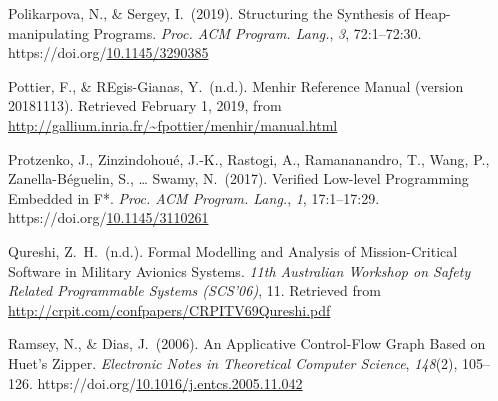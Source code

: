 \documentclass[12pt,twoside]{article}
\begin{document}
{\begin{thebibliography}{222}
\mdbibitemlabel{}Polikarpova, N., \& Sergey, I.~(2019). Structuring the Synthesis of Heap-manipulating Programs. \emph{Proc. ACM Program. Lang.}, \emph{3}, 72:1–72:30. https://doi.org/\href{https://dx.doi.org/10.1145/3290385}{10.1145/3290385}\label{polikarpova_structuring_2019}%

\mdbibitemlabel{}Pottier, F., \& REgis-Gianas, Y.~(n.d.). Menhir Reference Manual (version 20181113). Retrieved February 1, 2019, from \href{http://gallium.inria.fr/~fpottier/menhir/manual.html}{{\ttfamily http://\hspace{0pt}gallium.\hspace{0pt}inria.\hspace{0pt}fr/\hspace{0pt}\textasciitilde{}fpottier/\hspace{0pt}menhir/\hspace{0pt}manual.\hspace{0pt}html}}\label{pottier_menhir_nodate}%

\mdbibitemlabel{}Protzenko, J., Zinzindohoué, J.-K., Rastogi, A., Ramananandro, T., Wang, P., Zanella-Béguelin, S., … Swamy, N.~(2017). Verified Low-level Programming Embedded in F*. \emph{Proc. ACM Program. Lang.}, \emph{1}, 17:1–17:29. https://doi.org/\href{https://dx.doi.org/10.1145/3110261}{10.1145/3110261}\label{protzenko_verified_2017}%

\mdbibitemlabel{}Qureshi, Z.~H.~(n.d.). Formal Modelling and Analysis of Mission-Critical Software in Military Avionics Systems. \emph{11th Australian Workshop on Safety Related Programmable Systems (SCS’06)}, 11. Retrieved from \href{http://crpit.com/confpapers/CRPITV69Qureshi.pdf}{{\ttfamily http://\hspace{0pt}crpit.\hspace{0pt}com/\hspace{0pt}confpapers/\hspace{0pt}CRPITV69Qureshi.\hspace{0pt}pdf}}\label{qureshi_formal_nodate}%

\mdbibitemlabel{}Ramsey, N., \& Dias, J.~(2006). An Applicative Control-Flow Graph Based on Huet’s Zipper. \emph{Electronic Notes in Theoretical Computer Science}, \emph{148}(2), 105–126. https://doi.org/\href{https://dx.doi.org/10.1016/j.entcs.2005.11.042}{10.1016/j.entcs.2005.11.042}\label{ramsey_applicative_2006}%


\end{thebibliography}}
\end{document}
